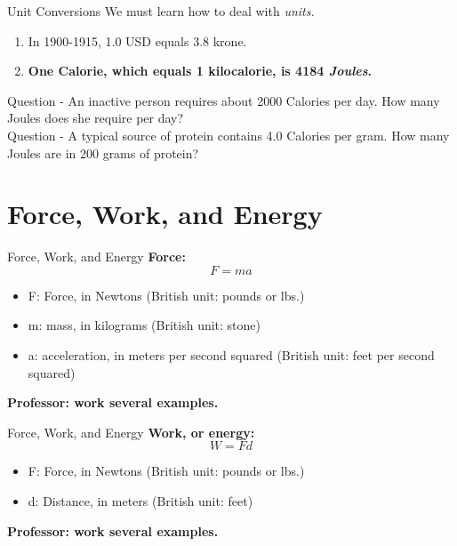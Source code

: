 \documentclass{beamer}
\begin{document}
\begin{frame}{Unit Conversions}
\small
We must learn how to deal with \textit{units.}
\begin{enumerate}
\item In 1900-1915, 1.0 USD equals 3.8 krone.
\item \textbf{One Calorie, which equals 1 kilocalorie, is 4184 \textit{Joules}.}
\end{enumerate}
Question - An inactive person requires about 2000 Calories per day.  How many Joules does she require per day?  \\ \vspace{0.5cm}
Question - A typical source of protein contains 4.0 Calories per gram.  How many Joules are in 200 grams of protein? \\
\end{frame}

\section{Force, Work, and Energy}

\begin{frame}{Force, Work, and Energy}
\textbf{Force:} 
\begin{equation}
F = m a
\end{equation}
\begin{itemize}
\item F: Force, in Newtons (British unit: pounds or lbs.)
\item m: mass, in kilograms (British unit: stone)
\item a: acceleration, in meters per second squared (British unit: feet per second squared)
\end{itemize}
\textbf{Professor: work several examples.}
\end{frame}

\begin{frame}{Force, Work, and Energy}
\textbf{Work, or energy:} 
\begin{equation}
W = F d
\end{equation}
\begin{itemize}
\item F: Force, in Newtons (British unit: pounds or lbs.)
\item d: Distance, in meters (British unit: feet)
\end{itemize}
\textbf{Professor: work several examples.}
\end{frame}
\end{document}
